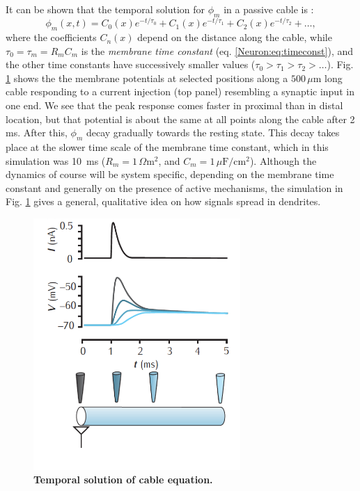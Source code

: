 \subsection{}
\label{sec:Neuron:cabletemp}
It can be shown that the temporal solution for $\phi_m$ in a passive cable is \cite{rall1969}:
\begin{equation}
\phi_m(x,t) = C_0(x) e^{-t/\tau_0} + C_1(x) e^{-t/\tau_1} + C_2(x) e^{-t/\tau_2} + \ldots, 
\label{Neuron:eq:cabletemporal}
\end{equation}
where the coefficients $C_n(x)$ depend on the distance along the cable, while $\tau_0 = \tau_m = R_m C_m$ is the \emph{membrane time constant} (eq. \ref{Neuron:eq:timeconst}), and the other time constants have successively smaller values ($\tau_0 > \tau_1 > \tau_2 > \ldots$). Fig. \ref{Neuron:fig:temporalrall} shows the the membrane potentials at selected positions along a $500 \, \mu$m long cable responding to a current injection (top panel) resembling a synaptic input in one end. We see that the peak response comes faster in proximal than in distal location, but that potential is about the same at all points along the cable after 2 ms. After this, $\phi_m$  decay gradually towards the resting state. This decay takes place at the slower time scale of the membrane time constant, which in this simulation was 10~ms ($R_m=1\,\Omega \text{m}^2$, and $C_m=1\,\mu\text{F}/\text{cm}^2$). Although the dynamics of course will be system specific, depending on the membrane time constant and generally on the presence of active mechanisms, the simulation in Fig. \ref{Neuron:fig:temporalrall} gives a general, qualitative idea on how signals spread in dendrites.

\begin{figure}[!ht]
\begin{center}
\includegraphics[width=0.7\textwidth]{Figures/Neuron/Temporalcable.png}
\end{center}
\caption{\textbf{Temporal solution of cable equation.}
}
\label{Neuron:fig:temporalrall}
\end{figure}

